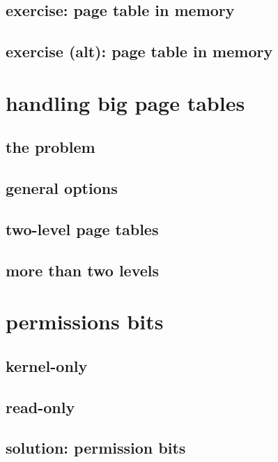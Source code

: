 \subsection{exercise: page table in memory}

\subsection{exercise (alt): page table in memory}


\section{handling big page tables}
\subsection{the problem}


\subsection{general options}


\subsection{two-level page tables}




\subsection{more than two levels}


\section{permissions bits}
\subsection{kernel-only}


\subsection{read-only}

\subsection{solution: permission bits}


